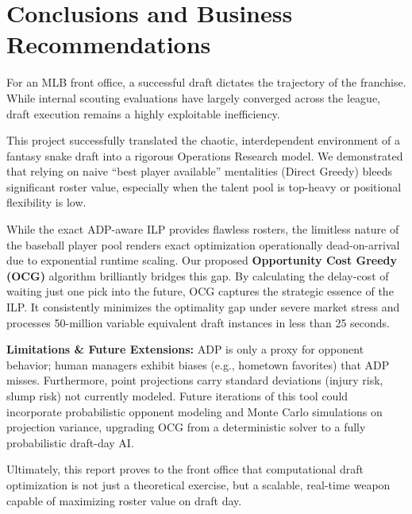 \documentclass[11pt,a4paper]{article}
\begin{document}
\section{Conclusions and Business Recommendations}

For an MLB front office, a successful draft dictates the trajectory of the franchise. While internal scouting evaluations have largely converged across the league, draft execution remains a highly exploitable inefficiency. 

This project successfully translated the chaotic, interdependent environment of a fantasy snake draft into a rigorous Operations Research model. We demonstrated that relying on naive ``best player available'' mentalities (Direct Greedy) bleeds significant roster value, especially when the talent pool is top-heavy or positional flexibility is low. 

While the exact ADP-aware ILP provides flawless rosters, the limitless nature of the baseball player pool renders exact optimization operationally dead-on-arrival due to exponential runtime scaling. Our proposed \textbf{Opportunity Cost Greedy (OCG)} algorithm brilliantly bridges this gap. By calculating the delay-cost of waiting just one pick into the future, OCG captures the strategic essence of the ILP. It consistently minimizes the optimality gap under severe market stress and processes 50-million variable equivalent draft instances in less than 25 seconds.

\textbf{Limitations \& Future Extensions:} ADP is only a proxy for opponent behavior; human managers exhibit biases (e.g., hometown favorites) that ADP misses. Furthermore, point projections carry standard deviations (injury risk, slump risk) not currently modeled. Future iterations of this tool could incorporate probabilistic opponent modeling and Monte Carlo simulations on projection variance, upgrading OCG from a deterministic solver to a fully probabilistic draft-day AI. 

Ultimately, this report proves to the front office that computational draft optimization is not just a theoretical exercise, but a scalable, real-time weapon capable of maximizing roster value on draft day.
\end{document}
